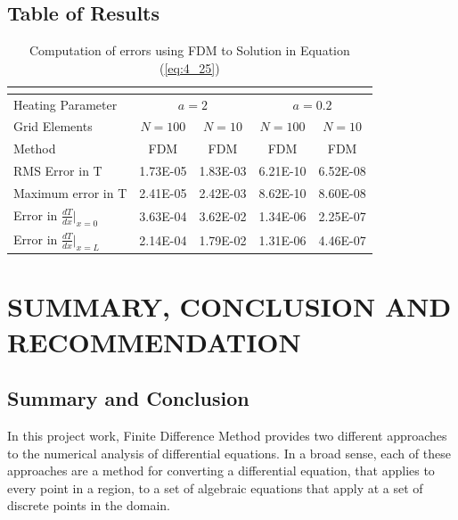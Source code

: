 \documentclass[12pt]{report}
\newcommand{\spn}[1]{\\[#1cm]}
\newcommand{\refn}[1]{(\ref{#1})}
\newcommand{\refx}[1]{\refn{eq:#1}}
\newcommand{\dsp}{\displaystyle}
\begin{document}
	\section{Table of Results}
	\begin{longtable}{lcccc}
		\caption{Computation of errors using FDM to Solution in Equation \refx{4_25}}\\
		\label{tb:4_2}\spn{-1}\hline
		Heating Parameter & \multicolumn{2}{c}{$a=2$} & \multicolumn{2}{c}{$a=0.2$}\\ \hline 
		Grid Elements & $N=100$ & $N=10$ & $N=100$ & $N=10$\\
		Method & FDM & FDM & FDM & FDM\\
		RMS Error in T & 1.73E-05	&1.83E-03 & 6.21E-10 & 6.52E-08\\
		Maximum error in T & 2.41E-05 & 2.42E-03 & 8.62E-10 & 8.60E-08\\[0.4cm]
		Error in $\dsp \frac{dT}{dx}\Big|_{x=0}$ & 3.63E-04 & 3.62E-02 & 1.34E-06 & 2.25E-07\\[0.4cm]
		Error in $\dsp \frac{dT}{dx}\Big|_{x=L}$ & 2.14E-04 & 1.79E-02 & 1.31E-06 & 4.46E-07 \\[0.4cm] \hline
	\end{longtable}
	
	
	
	
	
	
	
	
	
	
	
	
	
	
	
	
	
	
	
	
	
	\chapter{SUMMARY, CONCLUSION AND RECOMMENDATION}
	
	\section{Summary and Conclusion}
	In this project work, Finite Difference Method provides two different approaches to the numerical analysis of differential equations. In a broad sense, each of these approaches are a method for converting a differential equation, that applies to every point in a region, to a set of algebraic equations that apply at a set of discrete points in the domain.
	
\end{document}
